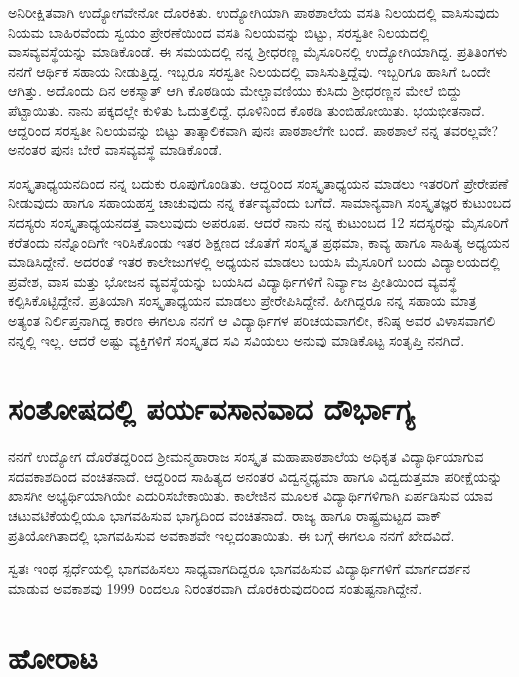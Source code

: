 ಅನಿರೀಕ್ಷಿತವಾಗಿ ಉದ್ಯೋಗವೇನೋ ದೊರಕಿತು.  ಉದ್ಯೋಗಿಯಾಗಿ ಪಾಠಶಾಲೆಯ ವಸತಿ ನಿಲಯದಲ್ಲಿ ವಾಸಿಸುವುದು ನಿಯಮ ಬಾಹಿರವೆಂದು ಸ್ವಯಂ ಪ್ರೇರಣೆಯಿಂದ ವಸತಿ ನಿಲಯವನ್ನು ಬಿಟ್ಟು, ಸರಸ್ವತೀ ನಿಲಯದಲ್ಲಿ ವಾಸವ್ಯವಸ್ಥೆಯನ್ನು ಮಾಡಿಕೊಂಡೆ. ಈ ಸಮಯದಲ್ಲಿ ನನ್ನ ಶ್ರೀಧರಣ್ಣ ಮೈಸೂರಿನಲ್ಲಿ ಉದ್ಯೋಗಿಯಾಗಿದ್ದ.  ಪ್ರತಿತಿಂಗಳು ನನಗೆ ಆರ್ಥಿಕ ಸಹಾಯ ನೀಡುತ್ತಿದ್ದ.  ಇಬ್ಬರೂ ಸರಸ್ವತೀ ನಿಲಯದಲ್ಲಿ ವಾಸಿಸುತ್ತಿದ್ದೆವು.  ಇಬ್ಬರಿಗೂ ಹಾಸಿಗೆ ಒಂದೇ ಆಗಿತ್ತು.  ಅದೊಂದು ದಿನ ಅಕಸ್ಮಾತ್ ಆಗಿ ಕೊಠಡಿಯ ಮೇಲ್ಚಾವಣಿಯು ಕುಸಿದು ಶ್ರೀಧರಣ್ಣನ ಮೇಲೆ ಬಿದ್ದು ಪೆಟ್ಟಾಯಿತು. ನಾನು ಪಕ್ಕದಲ್ಲೇ ಕುಳಿತು ಓದುತ್ತಲಿದ್ದೆ.  ಧೂಳಿನಿಂದ ಕೊಠಡಿ ತುಂಬಿಹೋಯಿತು. ಭಯಭೀತನಾದೆ. ಆದ್ದರಿಂದ ಸರಸ್ವತೀ ನಿಲಯವನ್ನು ಬಿಟ್ಟು ತಾತ್ಕಾಲಿಕವಾಗಿ ಪುನಃ ಪಾಠಶಾಲೆಗೇ ಬಂದೆ. ಪಾಠಶಾಲೆ ನನ್ನ ತವರಲ್ಲವೇ? ಅನಂತರ ಪುನಃ ಬೇರೆ ವಾಸವ್ಯವಸ್ಥೆ ಮಾಡಿಕೊಂಡೆ. 

ಸಂಸ್ಕೃತಾಧ್ಯಯನದಿಂದ ನನ್ನ ಬದುಕು ರೂಪುಗೊಂಡಿತು.  ಆದ್ದರಿಂದ ಸಂಸ್ಕೃತಾಧ್ಯಯನ ಮಾಡಲು ಇತರರಿಗೆ ಪ್ರೇರೇಪಣೆ ನೀಡುವುದು ಹಾಗೂ ಸಹಾಯಹಸ್ತ ಚಾಚುವುದು ನನ್ನ ಕರ್ತವ್ಯವೆಂದು ಬಗೆದೆ.  ಸಾಮಾನ್ಯವಾಗಿ  ಸಂಸ್ಕೃತಜ್ಞರ ಕುಟುಂಬದ ಸದಸ್ಯರು ಸಂಸ್ಕೃತಾಧ್ಯಯನದತ್ತ ವಾಲುವುದು ಅಪರೂಪ.  ಆದರೆ ನಾನು ನನ್ನ ಕುಟುಂಬದ 12 ಸದಸ್ಯರನ್ನು ಮೈಸೂರಿಗೆ ಕರೆತಂದು ನನ್ನೊಂದಿಗೇ ಇರಿಸಿಕೊಂಡು ಇತರ ಶಿಕ್ಷಣದ ಜೊತೆಗೆ ಸಂಸ್ಕೃತ ಪ್ರಥಮಾ, ಕಾವ್ಯ ಹಾಗೂ ಸಾಹಿತ್ಯ ಅಧ್ಯಯನ ಮಾಡಿಸಿದ್ದೇನೆ.  ಅದರಂತೆ ಇತರ ಕಾಲೇಜುಗಳಲ್ಲಿ ಅಧ್ಯಯನ ಮಾಡಲು ಬಯಸಿ ಮೈಸೂರಿಗೆ ಬಂದು ವಿದ್ಯಾಲಯದಲ್ಲಿ ಪ್ರವೇಶ, ವಾಸ ಮತ್ತು ಭೋಜನ ವ್ಯವಸ್ಥೆಯನ್ನು ಬಯಸಿದ ವಿದ್ಯಾರ್ಥಿಗಳಿಗೆ ನಿರ್ವ್ಯಾಜ ಪ್ರೀತಿಯಿಂದ ವ್ಯವಸ್ಥೆ ಕಲ್ಪಿಸಿಕೊಟ್ಟಿದ್ದೇನೆ.  ಪ್ರತಿಯಾಗಿ ಸಂಸ್ಕೃತಾಧ್ಯಯನ ಮಾಡಲು ಪ್ರೇರೇಪಿಸಿದ್ದೇನೆ.  ಹೀಗಿದ್ದರೂ ನನ್ನ ಸಹಾಯ ಮಾತ್ರ ಅತ್ಯಂತ ನಿರ್ಲಿಪ್ತನಾಗಿದ್ದ ಕಾರಣ ಈಗಲೂ ನನಗೆ ಆ ವಿದ್ಯಾರ್ಥಿಗಳ ಪರಿಚಯವಾಗಲೀ, ಕನಿಷ್ಠ ಅವರ ವಿಳಾಸವಾಗಲಿ ನನ್ನಲ್ಲಿ ಇಲ್ಲ.  ಆದರೆ ಅಷ್ಟು ವ್ಯಕ್ತಿಗಳಿಗೆ ಸಂಸ್ಕೃತದ ಸವಿ ಸವಿಯಲು ಅನುವು ಮಾಡಿಕೊಟ್ಟ ಸಂತೃಪ್ತಿ ನನಗಿದೆ.  

\section*{ಸಂತೋಷದಲ್ಲಿ ಪರ್ಯವಸಾನವಾದ ದೌರ್ಭಾಗ್ಯ}

ನನಗೆ ಉದ್ಯೋಗ ದೊರೆತದ್ದರಿಂದ ಶ್ರೀಮನ್ಮಹಾರಾಜ ಸಂಸ್ಕೃತ ಮಹಾಪಾಠಶಾಲೆಯ ಅಧಿಕೃತ ವಿದ್ಯಾರ್ಥಿಯಾಗುವ ಸದವಕಾಶದಿಂದ ವಂಚಿತನಾದೆ. ಆದ್ದರಿಂದ ಸಾಹಿತ್ಯದ ಅನಂತರ ವಿದ್ವನ್ಮಧ್ಯಮಾ ಹಾಗೂ ವಿದ್ವದುತ್ತಮಾ ಪರೀಕ್ಷೆಯನ್ನು ಖಾಸಗೀ ಅಭ್ಯರ್ಥಿಯಾಗಿಯೇ ಎದುರಿಸಬೇಕಾಯಿತು.  ಕಾಲೇಜಿನ ಮೂಲಕ ವಿದ್ಯಾರ್ಥಿಗಳಿಗಾಗಿ ಏರ್ಪಡಿಸುವ ಯಾವ ಚಟುವಟಿಕೆಯಲ್ಲಿಯೂ ಭಾಗವಹಿಸುವ ಭಾಗ್ಯದಿಂದ ವಂಚಿತನಾದೆ.  ರಾಜ್ಯ ಹಾಗೂ ರಾಷ್ಟ್ರಮಟ್ಟದ ವಾಕ್ ಪ್ರತಿಯೋಗಿತಾದಲ್ಲಿ ಭಾಗವಹಿಸುವ ಅವಕಾಶವೇ ಇಲ್ಲದಂತಾಯಿತು.  ಈ ಬಗ್ಗೆ ಈಗಲೂ ನನಗೆ ಖೇದವಿದೆ.  

ಸ್ವತಃ ಇಂಥ ಸ್ಪರ್ಧೆಯಲ್ಲಿ ಭಾಗವಹಿಸಲು ಸಾಧ್ಯವಾಗದಿದ್ದರೂ ಭಾಗವಹಿಸುವ ವಿದ್ಯಾರ್ಥಿಗಳಿಗೆ ಮಾರ್ಗದರ್ಶನ ಮಾಡುವ ಅವಕಾಶವು 1999 ರಿಂದಲೂ ನಿರಂತರವಾಗಿ ದೊರಕಿರುವುದರಿಂದ ಸಂತುಷ್ಟನಾಗಿದ್ದೇನೆ. 

\section*{ಹೋರಾಟ}

